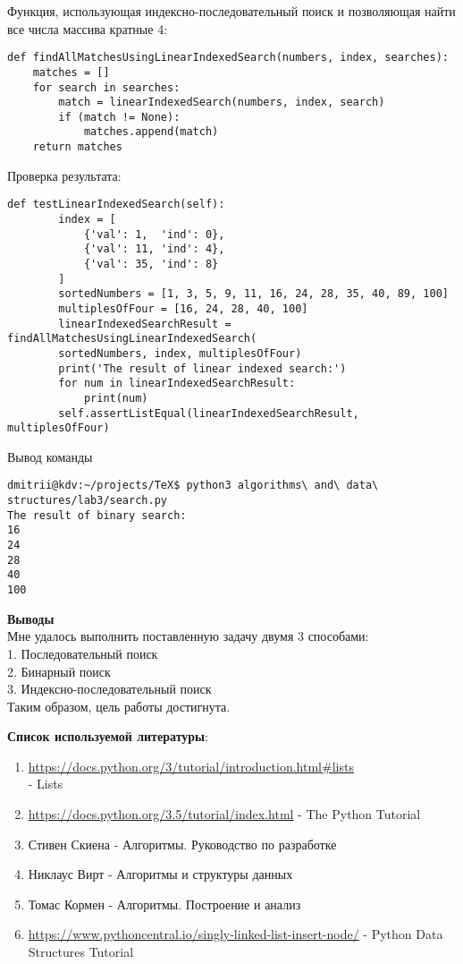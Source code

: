 \documentclass[12pt]{article}
\begin{document}
Функция, использующая индексно-последовательный поиск и позволяющая найти все числа массива кратные 4:
\begin{verbatim}
def findAllMatchesUsingLinearIndexedSearch(numbers, index, searches):
	matches = []
	for search in searches:
		match = linearIndexedSearch(numbers, index, search)
		if (match != None):
			matches.append(match)
	return matches
\end{verbatim}
Проверка результата:
\begin{verbatim}
def testLinearIndexedSearch(self):
		index = [
			{'val': 1, 	'ind': 0}, 
			{'val': 11, 'ind': 4}, 
			{'val': 35, 'ind': 8}
		]
		sortedNumbers = [1, 3, 5, 9, 11, 16, 24, 28, 35, 40, 89, 100]
		multiplesOfFour = [16, 24, 28, 40, 100]
		linearIndexedSearchResult = findAllMatchesUsingLinearIndexedSearch(
		sortedNumbers, index, multiplesOfFour)
		print('The result of linear indexed search:')
		for num in linearIndexedSearchResult:
			print(num)
		self.assertListEqual(linearIndexedSearchResult, multiplesOfFour)
\end{verbatim}

Вывод команды
\begin{verbatim}
dmitrii@kdv:~/projects/TeX$ python3 algorithms\ and\ data\ structures/lab3/search.py 
The result of binary search:
16
24
28
40
100
\end{verbatim}
\textbf{Выводы}\\
Мне удалось выполнить поставленную задачу двумя 3 способами: \\
1. Последовательный поиск \\
2. Бинарный поиск \\
3. Индексно-последовательный поиск \\
Таким образом, цель работы достигнута.
\par\bigskip
\textbf{Список используемой литературы}:
\begin{enumerate}
\item \url{https://docs.python.org/3/tutorial/introduction.html#lists} \\ - Lists
\item \url{https://docs.python.org/3.5/tutorial/index.html} - The Python Tutorial
\item Стивен Скиена - Алгоритмы. Руководство по разработке
\item Никлаус Вирт - Алгоритмы и структуры данных
\item Томас Кормен - Алгоритмы. Построение и анализ
\item \url{https://www.pythoncentral.io/singly-linked-list-insert-node/} - Python Data Structures Tutorial
\end{enumerate}
\end{document}
